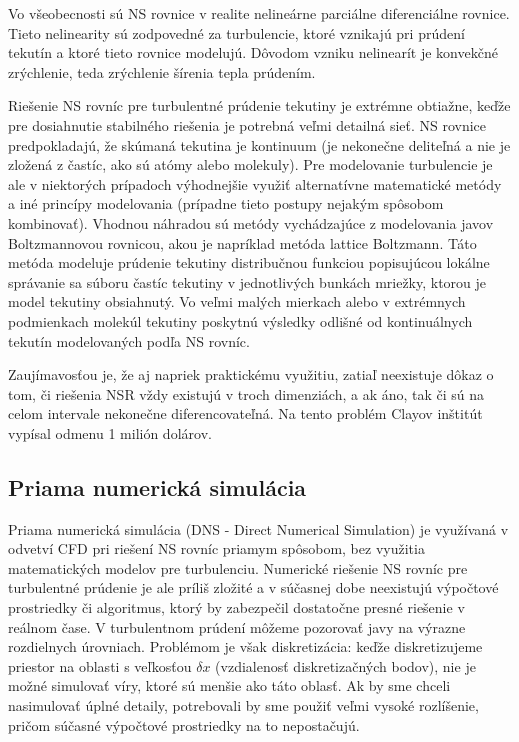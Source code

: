 \documentclass[]{tukediphc}
\begin{document}
Vo všeobecnosti sú NS rovnice v realite nelineárne parciálne diferenciálne rovnice. Tieto nelinearity sú zodpovedné za turbulencie, ktoré vznikajú pri prúdení tekutín a ktoré tieto rovnice modelujú. Dôvodom vzniku nelinearít je konvekčné zrýchlenie, teda zrýchlenie šírenia tepla prúdením. 

Riešenie NS rovníc pre turbulentné prúdenie tekutiny je extrémne obtiažne, keďže pre dosiahnutie stabilného riešenia je potrebná veľmi detailná sieť. NS rovnice predpokladajú, že skúmaná tekutina je kontinuum (je nekonečne deliteľná a nie je zložená z častíc, ako sú atómy alebo molekuly). Pre modelovanie turbulencie je ale v niektorých prípadoch výhodnejšie využiť alternatívne matematické metódy a iné princípy modelovania (prípadne tieto postupy nejakým spôsobom kombinovať). Vhodnou náhradou sú metódy vychádzajúce z modelovania javov Boltzmannovou rovnicou, akou je napríklad metóda lattice Boltzmann. Táto metóda modeluje prúdenie tekutiny distribučnou funkciou popisujúcou lokálne správanie sa súboru častíc tekutiny v jednotlivých bunkách mriežky, ktorou je model tekutiny obsiahnutý. Vo veľmi malých mierkach alebo v extrémnych podmienkach molekúl tekutiny poskytnú výsledky odlišné od kontinuálnych tekutín modelovaných podľa NS rovníc.

Zaujímavosťou je, že aj napriek praktickému využitiu, zatiaľ neexistuje dôkaz o tom, či riešenia NSR vždy existujú v troch dimenziách, a ak áno, tak či sú na celom intervale nekonečne diferencovateľná. Na tento problém Clayov inštitút vypísal odmenu 1 milión dolárov.

\subsection{Priama numerická simulácia}

Priama numerická simulácia (DNS - Direct Numerical Simulation) je využívaná v odvetví CFD pri riešení NS rovníc priamym spôsobom, bez využitia matematických modelov pre turbulenciu. Numerické riešenie NS rovníc pre turbulentné prúdenie je ale príliš zložité a v súčasnej dobe neexistujú výpočtové prostriedky či algoritmus, ktorý by zabezpečil dostatočne presné riešenie v reálnom čase. V turbulentnom prúdení môžeme pozorovať javy na výrazne rozdielnych úrovniach. Problémom je však diskretizácia: keďže diskretizujeme priestor na oblasti s veľkosťou $\delta x$ (vzdialenosť diskretizačných bodov), nie je možné simulovať víry, ktoré sú menšie ako táto oblasť. Ak by sme chceli nasimulovať úplné detaily, potrebovali by sme použiť veľmi vysoké rozlíšenie, pričom súčasné výpočtové prostriedky na to nepostačujú.
\end{document}
